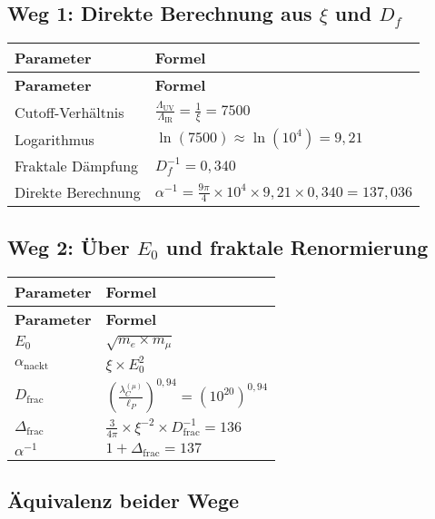 \documentclass[12pt,a4paper]{article}
\begin{document}
\subsection{Weg 1: Direkte Berechnung aus \(\xi\) und \(D_f\)}

\begin{longtable}{|p{4cm}|p{6cm}|}
	\hline
	\textbf{Parameter} & \textbf{Formel} \\
	\hline
	\endfirsthead
	\hline
	\textbf{Parameter} & \textbf{Formel} \\
	\hline
	\endhead
	Cutoff-Verhältnis & \(\frac{\Lambda_{\text{UV}}}{\Lambda_{\text{IR}}} = \frac{1}{\xi} = 7500\) \\
	\hline
	Logarithmus & \(\ln(7500) \approx \ln(10^4) = 9{,}21\) \\
	\hline
	Fraktale Dämpfung & \(D_f^{-1} = 0{,}340\) \\
	\hline
	Direkte Berechnung & \(\alpha^{-1} = \frac{9\pi}{4} \times 10^4 \times 9{,}21 \times 0{,}340 = 137{,}036\) \\
	\hline
\end{longtable}

\subsection{Weg 2: Über \(E_0\) und fraktale Renormierung}

\begin{longtable}{|p{3cm}|p{5cm}|}
	\hline
	\textbf{Parameter} & \textbf{Formel} \\
	\hline
	\endfirsthead
	\hline
	\textbf{Parameter} & \textbf{Formel} \\
	\hline
	\endhead
	\(E_0\) & \(\sqrt{m_e \times m_{\mu}}\) \\
	\hline
	\(\alpha_{\text{nackt}}\) & \(\xi \times E_0^2\) \\
	\hline
	\(D_{\text{frac}}\) & \(\left(\frac{\lambda_C^{(\mu)}}{\ell_P}\right)^{0{,}94} = (10^{20})^{0{,}94}\) \\
	\hline
	\(\Delta_{\text{frac}}\) & \(\frac{3}{4\pi} \times \xi^{-2} \times D_{\text{frac}}^{-1} = 136\) \\
	\hline
	\(\alpha^{-1}\) & \(1 + \Delta_{\text{frac}} = 137\) \\
	\hline
\end{longtable}

\subsection{Äquivalenz beider Wege}
\end{document}
